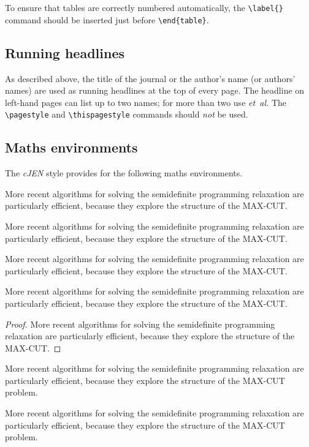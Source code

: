 \documentclass[]{cJEN2e}
\begin{document}
To ensure that tables are correctly numbered automatically, the
\verb"\label{}" command should be inserted just before
\verb"\end{table}".

\subsection{Running headlines}\label{markboth}

As described above, the title of the journal or the author's name (or authors' names) are used as running headlines at the top of every page. The headline on left-hand pages can list up to two names; for more than two use {\it et~al.} The \verb"\pagestyle" and \verb"\thispagestyle" commands should {\it not\/} be used.

\subsection{Maths environments}

The {\it cJEN} style provides for the following maths environments.

\begin{lemma}
More recent algorithms for solving the semidefinite programming
relaxation are particularly efficient, because they explore the structure
of the MAX-CUT.
\end{lemma}
\begin{theorem}
More recent algorithms for solving the semidefinite programming
relaxation are particularly efficient, because they explore the structure
of the MAX-CUT.
\end{theorem}
\begin{corollary}
More recent algorithms for solving the semidefinite programming
relaxation are particularly efficient, because they explore the
structure of the MAX-CUT.
\end{corollary}
\begin{proposition}
More recent algorithms for solving the semidefinite programming
relaxation are particularly efficient, because they explore the structure
of the MAX-CUT.
\end{proposition}
\begin{proof}
More recent algorithms for solving the semidefinite programming
relaxation are particularly efficient, because they explore the structure
of the MAX-CUT.
\end{proof}
\begin{remark}
More recent algorithms for solving the semidefinite programming
relaxation are particularly efficient, because they explore the
structure of the MAX-CUT problem.
\end{remark}
\begin{algorithm}
More recent algorithms for solving the semidefinite programming
relaxation are particularly efficient, because they explore the
structure of the MAX-CUT problem.
\end{algorithm}
\end{document}
